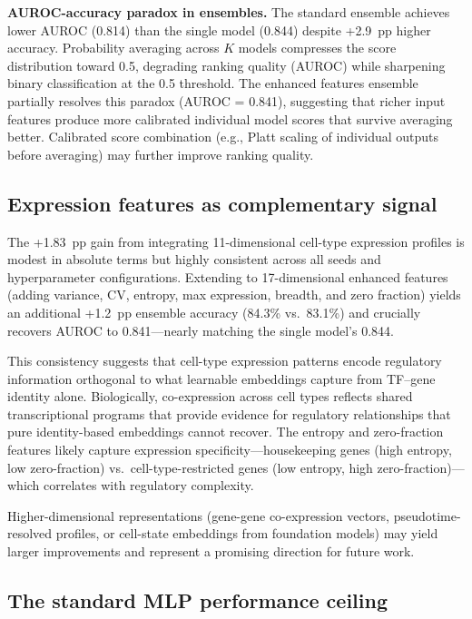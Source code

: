 \documentclass[10pt,twocolumn]{article}
\begin{document}
\textbf{AUROC-accuracy paradox in ensembles.}
The standard ensemble achieves lower AUROC (0.814) than the single model (0.844) despite +2.9~pp higher accuracy.
Probability averaging across $K$ models compresses the score distribution toward 0.5, degrading ranking quality (AUROC) while sharpening binary classification at the 0.5 threshold.
The enhanced features ensemble partially resolves this paradox (AUROC = 0.841), suggesting that richer input features produce more calibrated individual model scores that survive averaging better.
Calibrated score combination (e.g., Platt scaling of individual outputs before averaging) may further improve ranking quality.

\subsection{Expression features as complementary signal}

The +1.83~pp gain from integrating 11-dimensional cell-type expression profiles is modest in absolute terms but highly consistent across all seeds and hyperparameter configurations.
Extending to 17-dimensional enhanced features (adding variance, CV, entropy, max expression, breadth, and zero fraction) yields an additional +1.2~pp ensemble accuracy (84.3\% vs.\ 83.1\%) and crucially recovers AUROC to 0.841---nearly matching the single model's 0.844.

This consistency suggests that cell-type expression patterns encode regulatory information orthogonal to what learnable embeddings capture from TF--gene identity alone.
Biologically, co-expression across cell types reflects shared transcriptional programs that provide evidence for regulatory relationships that pure identity-based embeddings cannot recover.
The entropy and zero-fraction features likely capture expression specificity---housekeeping genes (high entropy, low zero-fraction) vs.\ cell-type-restricted genes (low entropy, high zero-fraction)---which correlates with regulatory complexity.

Higher-dimensional representations (gene-gene co-expression vectors, pseudotime-resolved profiles, or cell-state embeddings from foundation models) may yield larger improvements and represent a promising direction for future work.

\subsection{The standard MLP performance ceiling}
\label{sec:ceiling}
\end{document}
